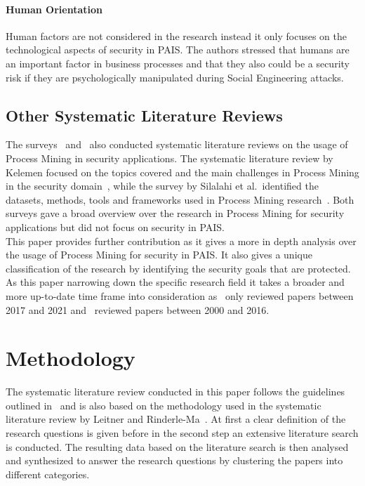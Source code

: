 \documentclass[runningheads]{llncs}
\begin{document}
\paragraph{Human Orientation} Human factors are not considered in the research instead it only focuses on the technological aspects of security in PAIS\@. The authors stressed that
humans are an important factor in business processes and that they also could be a security risk if they are psychologically manipulated during Social Engineering attacks.
\subsection{Other Systematic Literature Reviews}\label{Other}
The surveys~\cite{Kelemen_2018} and~\cite{Silalahi20221} also conducted systematic literature reviews on the usage of Process Mining in security applications. The systematic literature review
by Kelemen focused on the topics covered and the main challenges in Process Mining in the security domain~\cite{Kelemen_2018}, while the survey by Silalahi et al.\ identified the datasets,
methods, tools and frameworks used in Process Mining research~\cite{Silalahi20221}. Both surveys gave a broad overview over the research in Process Mining for security applications but did not
focus on security in PAIS\@.\\
This paper provides further contribution as it gives a more in depth analysis over the usage of Process Mining for security in PAIS\@. It also gives a unique classification of the research by
identifying the security goals that are protected. As this paper narrowing down the specific research field it takes a broader and more up-to-date time frame into consideration as~\cite{Silalahi20221} only reviewed
papers between 2017 and 2021 and~\cite{Kelemen_2018} reviewed papers between 2000 and 2016.
\section{Methodology}\label{Methodology}
The systematic literature review conducted in this paper follows the guidelines outlined in~\cite{BRERETON2007571} and is also based on the methodology used in the systematic literature review by Leitner and Rinderle-Ma~\cite{Leitner2014273}.
At first a clear definition of the research questions is given before in the second step an extensive literature search is conducted. The resulting data based on the literature search is then analysed and synthesized to answer the research questions by clustering
the papers into different categories.\\
\end{document}
